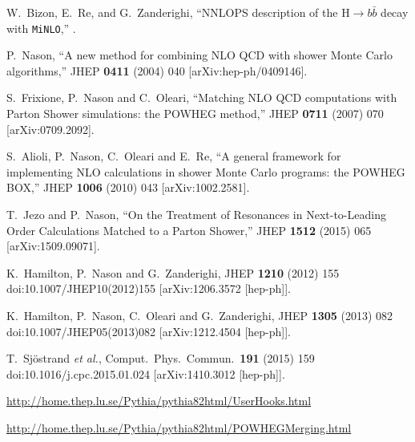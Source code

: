 \documentclass[11pt,a4paper]{article}\pdfoutput=1
\newcommand{\MINLO}{{\tt{MiNLO}}}
\begin{document}
\begin{thebibliography}{10}

  W.~Bizon, E.~Re, and G.~Zanderighi,
  ``NNLOPS description of the H$\to\! b\bar{b}$ decay with \MINLO{},''
  .
  
  P.~Nason,
  ``A new method for combining NLO QCD with shower Monte Carlo algorithms,''
  JHEP {\bf 0411} (2004) 040
  [arXiv:hep-ph/0409146].

  S.~Frixione, P.~Nason and C.~Oleari,
  ``Matching NLO QCD computations with Parton Shower simulations: the POWHEG method,''
  JHEP {\bf 0711} (2007) 070
  [arXiv:0709.2092].

  S.~Alioli, P.~Nason, C.~Oleari and E.~Re,
  ``A general framework for implementing NLO calculations in shower Monte Carlo programs: the POWHEG BOX,''
  JHEP {\bf 1006} (2010) 043
  [arXiv:1002.2581].

  T.~Jezo and P.~Nason,
  ``On the Treatment of Resonances in Next-to-Leading Order Calculations Matched to a Parton Shower,''
  JHEP {\bf 1512} (2015) 065
  [arXiv:1509.09071].

  K.~Hamilton, P.~Nason and G.~Zanderighi,
  JHEP {\bf 1210} (2012) 155
  doi:10.1007/JHEP10(2012)155
  [arXiv:1206.3572 [hep-ph]].

  K.~Hamilton, P.~Nason, C.~Oleari and G.~Zanderighi,
  JHEP {\bf 1305} (2013) 082
  doi:10.1007/JHEP05(2013)082
  [arXiv:1212.4504 [hep-ph]].

  T.~Sjöstrand {\it et al.},
  Comput.\ Phys.\ Commun.\  {\bf 191} (2015) 159
  doi:10.1016/j.cpc.2015.01.024
  [arXiv:1410.3012 [hep-ph]].

  \url{http://home.thep.lu.se/Pythia/pythia82html/UserHooks.html}

  \url{http://home.thep.lu.se/Pythia/pythia82html/POWHEGMerging.html}
  
\end{thebibliography}
\end{document}
